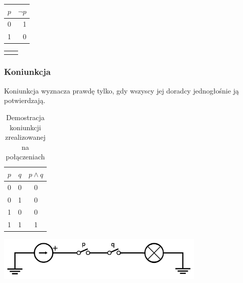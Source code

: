 \documentclass[a4paper,12pt]{article}
\begin{document}
\begin{table}[h!]
\centering

\begin{minipage}{5.5cm}
\centering

\begin{tabular}{ | c || r | }
  \hline
  $p$ & $\lnot p$ \\ \hline
  0 & 1 \\
  1 & 0 \\
  \hline
\end{tabular}
\end{minipage}
\begin{minipage}{11cm}
\begin{tabular}{  c r }
  & \\
\end{tabular}
\end{minipage}
\end{table}

\subsubsection{Koniunkcja}

Koniunkcja wyznacza prawdę tylko, gdy wszyscy jej doradcy jednogłośnie ją potwierdzają.

\begin{table}[h!]
\centering

\begin{minipage}{5.5cm}
\centering

\begin{tabular}{ | c | c || c | }
  \hline
  $p$ & $q$ & $p \land q$ \\ \hline
  0 & 0 & 0 \\
  0 & 1 & 0 \\
  1 & 0 & 0 \\
  1 & 1 & 1 \\
  \hline
\end{tabular}
\end{minipage}
\begin{minipage}{11cm}
   \includegraphics[width=10cm]{grafika/obwody/circuit-and.png}
   \caption*{Demostracja koniunkcji zrealizowanej na połączeniach}
\end{minipage}
\end{table}
\end{document}
